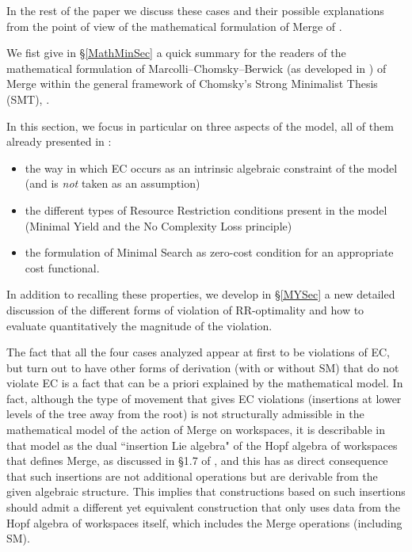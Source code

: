 \documentclass[12pt]{amsart}
\numberwithin{equation}{section}
\begin{document}
\smallskip

In the rest of the paper we discuss these cases and their possible 
explanations from the point of view of the mathematical formulation of Merge
of \cite{MCB}. 

\smallskip

We fist give in \S \ref{MathMinSec}  a quick summary for the readers
of the mathematical formulation of Marcolli--Chomsky--Berwick (as developed in \cite{MCB})
of Merge within the general framework of Chomsky's
Strong Minimalist Thesis (SMT), \cite{ChomskyElements}. 


In this section, we focus in particular on three aspects of the model, all of them 
already presented in \cite{MCB}:
\begin{itemize}
\item the way in which EC occurs as an intrinsic algebraic constraint
of the model (and is {\em not} taken as an assumption) 
\item the different types of Resource Restriction conditions present in the model
(Minimal Yield and the No Complexity Loss principle)
\item the formulation of Minimal Search as zero-cost condition for an
appropriate cost functional. 
\end{itemize}
In addition to recalling these properties, we develop in \S \ref{MYSec} a new
detailed discussion of the different forms of violation of RR-optimality and
how to evaluate quantitatively the magnitude of the violation. 

\smallskip

The fact that all the four cases analyzed appear at first to be
violations of EC, but turn out to have other forms
of derivation (with or without SM) that do not violate EC
is a fact that can be a priori explained by the
mathematical model. In fact, although the type of
movement that gives EC violations (insertions at
lower levels of the tree away from the root) is not
structurally admissible in the mathematical model of the 
action of Merge on workspaces, it is describable
in that model as the dual ``insertion Lie algebra"
of the Hopf algebra of workspaces that defines
Merge, as discussed in \S 1.7 of \cite{MCB}, 
and this has as direct consequence that such insertions
are not additional operations but are derivable from
the given algebraic structure. This implies that 
constructions based on such insertions
should admit a different yet equivalent construction 
that only uses data from the Hopf algebra of
workspaces itself, which includes the Merge
operations (including SM). 
\end{document}
